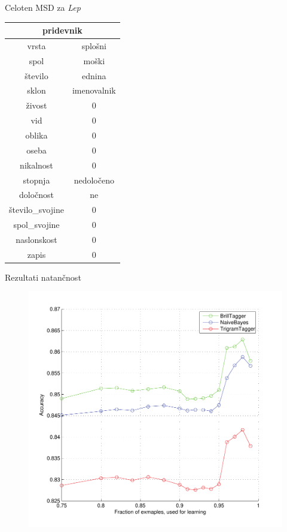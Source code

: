 \documentclass{beamer}
\begin{document}
\begin{frame}{Celoten MSD za \textit{Lep} }
\begin{table}[h]
\begin{center}
\begin{tabular}{c|c}
\multicolumn{2}{c}{pridevnik}\\\hline\hline
vrsta & splošni \\
spol & moški \\
število & ednina \\
sklon & imenovalnik \\
živost & 0 \\
vid & 0 \\
oblika & 0 \\
oseba & 0 \\
nikalnost & 0 \\
stopnja & nedoločeno \\
določnost & ne \\
število\_svojine & 0 \\
spol\_svojine & 0 \\
naslonskost & 0 \\
zapis & 0 \\
\end{tabular}
\end{center}
\label{tab:MSDLep}
\end{table}
\end{frame}

\begin{frame}{Rezultati natančnost}
\begin{figure}[h]
\begin{center}
\includegraphics[height=0.85\textheight]{../evaluation/graph.pdf} 
\end{center}
\end{figure}
\end{frame}
\end{document}
